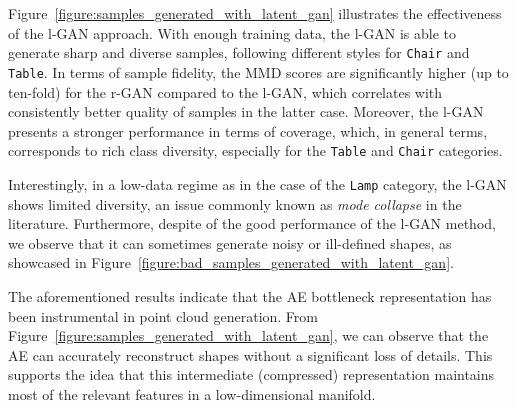 \documentclass[12pt]{article}
\begin{document}
    Figure~\ref{figure:samples_generated_with_latent_gan} illustrates the effectiveness of the l-GAN approach. With enough training data, the l-GAN is able to generate sharp and diverse samples, following different styles for \verb|Chair| and \verb|Table|. In terms of sample fidelity, the MMD scores are significantly higher (up to ten-fold) for the r-GAN compared to the l-GAN, which correlates with consistently better quality of samples in the latter case. Moreover, the l-GAN presents a stronger performance in terms of coverage, which, in general terms, corresponds to rich class diversity, especially for the \verb|Table| and \verb|Chair| categories.

    Interestingly, in a low-data regime as in the case of the \verb|Lamp| category, the l-GAN shows limited diversity, an issue commonly known as \textit{mode collapse} in the literature. Furthermore, despite of the good performance of the l-GAN method, we observe that it can sometimes generate noisy or ill-defined shapes, as showcased in Figure~\ref{figure:bad_samples_generated_with_latent_gan}.

    The aforementioned results indicate that the AE bottleneck representation has been instrumental in point cloud generation. From Figure~\ref{figure:samples_generated_with_latent_gan}, we can observe that the AE can accurately reconstruct shapes without a significant loss of details. This supports the idea that this intermediate (compressed) representation maintains most of the relevant features in a low-dimensional manifold.
\end{document}
